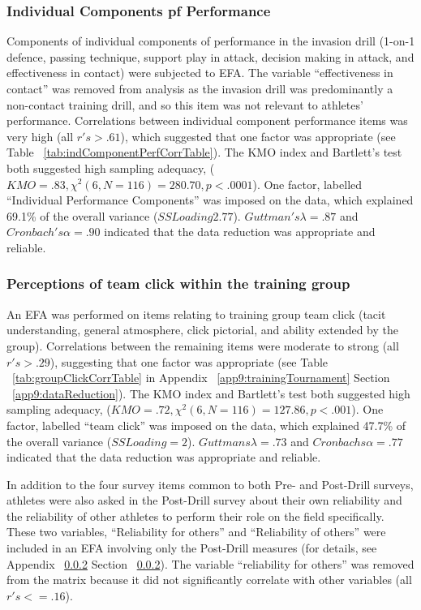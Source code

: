 \subsubsection{Individual Components pf Performance\label{app9:dataReductionPerformance}}
Components of individual components of performance in the invasion drill (1-on-1 defence, passing technique, support play in attack, decision making in attack, and effectiveness in contact) were subjected to EFA.  The variable ``effectiveness in contact'' was removed from analysis as the invasion drill was predominantly a non-contact training drill, and so this item was not relevant to athletes' performance.  Correlations between individual component performance items was very high (all $r's > .61$), which suggested that one factor was appropriate (see Table ~\ref{tab:indComponentPerfCorrTable}).
The KMO index and Bartlett's test both suggested high sampling adequacy, ($KMO = .83, \chi^2(6, N = 116) = 280.70, p < .0001$). One factor, labelled ``Individual Performance Components'' was imposed on the data, which explained 69.1\% of the overall variance ($SS Loading  2.77$).  $Guttman's \lambda = .87$  and  $Cronbach's \alpha = .90$ indicated that the data reduction was appropriate and reliable.


\subsubsection{Perceptions of team click within the training group}
An EFA was performed on items relating to training group team click (tacit understanding, general atmosphere, click pictorial, and ability extended by the group).  Correlations between the remaining items were moderate to strong (all $r's > .29$), suggesting that one factor was appropriate (see Table ~\ref{tab:groupClickCorrTable} in Appendix ~\ref{app9:trainingTournament} Section ~\ref{app9:dataReduction}). The KMO index and Bartlett's test both suggested high sampling adequacy, ($KMO =  .72, \chi^2(6, N = 116) = 127.86, p < .001$). One factor, labelled ``team click'' was imposed on the data, which explained 47.7\% of the overall variance ($SS Loading = 2$). $Guttmans \lambda = .73$ and $Cronbachs \alpha = .77$ indicated that the data reduction was appropriate and reliable.

In addition to the four survey items common to both Pre- and Post-Drill surveys, athletes were also asked in the Post-Drill survey about their own reliability and the reliability of other athletes to perform their role on the field specifically. These two variables, ``Reliability for others'' and ``Reliability of others'' were included in an EFA involving only the Post-Drill measures (for details, see Appendix ~\ref{} Section ~\ref{}).  The variable ``reliability for others'' was removed from the matrix because it did not significantly correlate with other variables (all $r's <= .16$).


